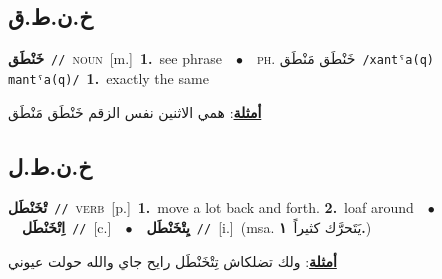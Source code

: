 \documentclass[10pt,a4paper,twoside]{article} %
\begin{document}
\begin{multicols}{2}
\vspace{-3mm}
\subsection*{\color{blue}\foreignlanguage{arabic}{خ.ن.ط.ق}\color{blue}{}} 

{\setlength\topsep{0pt}\textbf{\foreignlanguage{arabic}{خَنْطَق}}\ {\color{gray}\texttt{//}\color{black}}\ \textsc{noun}\ [m.]\ \textbf{1.}~see phrase\ \ $\bullet$\ \ \textsc{ph.} \color{gray} \foreignlanguage{arabic}{خَنْطَق مَنْطَق}\color{black}\ {\color{gray}\texttt{/{\sffamily xantˤa(q) mantˤa(q)}/}\color{black}}\ \textbf{1.}~exactly the same\  \begin{flushright}\color{gray}\foreignlanguage{arabic}{\textbf{\underline{\foreignlanguage{arabic}{أمثلة}}}: همي الاثنين نفس الزقم خَنْطَق مَنْطَق}\end{flushright}\color{black}} \vspace{2mm}

\vspace{-3mm}
\subsection*{\color{blue}\foreignlanguage{arabic}{خ.ن.ط.ل}\color{blue}{}} 

{\setlength\topsep{0pt}\textbf{\foreignlanguage{arabic}{تْخَنْطَل}}\ {\color{gray}\texttt{//}\color{black}}\ \textsc{verb}\ [p.]\ \textbf{1.}~move a lot back and forth.  \textbf{2.}~loaf around\ \ $\bullet$\ \ \setlength\topsep{0pt}\textbf{\foreignlanguage{arabic}{اِتْخَنْطَل}}\ {\color{gray}\texttt{//}\color{black}}\ [c.]\ \ $\bullet$\ \ \setlength\topsep{0pt}\textbf{\foreignlanguage{arabic}{يِتْخَنْطَل}}\ {\color{gray}\texttt{//}\color{black}}\ [i.]\ \color{gray}(msa. \foreignlanguage{arabic}{يَتَحرَّك كثيراً}~\foreignlanguage{arabic}{\textbf{١.}})\color{black}\  \begin{flushright}\color{gray}\foreignlanguage{arabic}{\textbf{\underline{\foreignlanguage{arabic}{أمثلة}}}: ولك تضلكاش تِتْخَنْطَل رايح جاي والله حولت عيوني}\end{flushright}\color{black}} \vspace{2mm}


\end{multicols}
\end{document}
